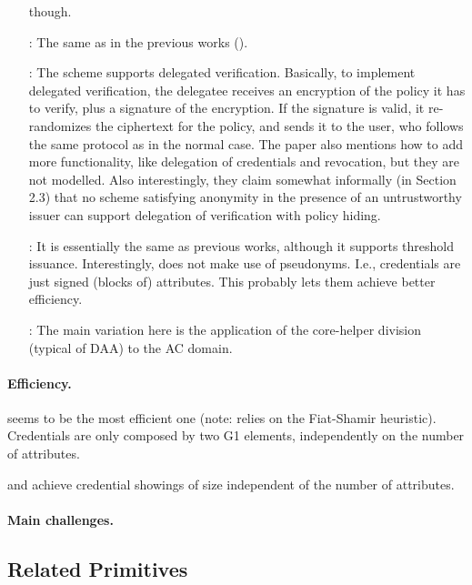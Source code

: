 \begin{enumerate}
  though.
\item[\cite{cdhk15}:] The same as in the previous works (\cite{cl01,cl02,cl04}).
\item[\cite{dmm+18}:] The scheme supports delegated verification. Basically,
  to implement delegated verification, the delegatee receives an encryption of
  the policy it has to verify, plus a signature of the encryption. If the
  signature is valid, it re-randomizes the ciphertext for the policy, and
  sends it to the user, who follows the same protocol as in the normal case.
  The paper also mentions how to add more functionality, like delegation of
  credentials and revocation, but they are not modelled. Also interestingly,
  they claim somewhat informally (in Section 2.3) that no scheme satisfying
  anonymity in the presence of an untrustworthy issuer can support delegation
  of verification with policy hiding.
\item[\cite{sms+19}:] It is essentially the same as previous works, although it
  supports threshold issuance. Interestingly, \cite{sms+19} does not make use
  of pseudonyms. I.e., credentials are just signed (blocks of) attributes. This
  probably lets them achieve better efficiency. 
\item[\cite{hs21}:] The main variation here is the application of the core-helper
  division (typical of DAA) to the AC domain.
\end{enumerate}

\paragraph{Efficiency.}

\cite{sms+19} seems to be the most efficient one (note: relies on the
Fiat-Shamir heuristic). Credentials are only composed by two G1 elements,
independently on the number of attributes. 

\cite{cdhk15} and \cite{fhs19} achieve credential showings of size independent
of the number of attributes.

\paragraph{Main challenges.}

\subsection{Related Primitives}

